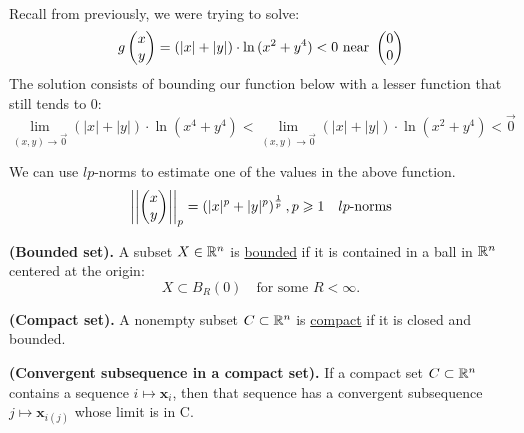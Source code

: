 \\

Recall from previously, we were trying to solve:
\[g\begin{pmatrix} x \\ y \end{pmatrix}= \left( |x|+|y| \right)\cdot \ln{(x^2+y^4)}<0 \text{ near }\begin{pmatrix} 0 \\ 0 \end{pmatrix}\]
The solution consists of bounding our function below with a lesser function that still tends to 0: 
\[\lim_{(x,y)\to \vec{0}}(|x|+|y|)\cdot \ln{(x^4+y^4)}<\lim_{(x,y)\to \vec{0}}(|x|+|y|)\cdot \ln{(x^2+y^4)}<\vec{0}\]

We can use $lp$-norms to estimate one of the values in the above function.
\[\left|\left| \begin{pmatrix} x \\ y \end{pmatrix}\right|\right|_p=\left(|x|^p + |y|^p\right)^{\frac{1}{p}}, p\geqslant 1\quad lp\text{-norms}\]

\iffalse
\[(x^4+y^4)^{\frac{1}{4}}\cdot \ln{(x^4+y^4)}<(|x|+|y|)\cdot \ln{(x^4+y^4)}<g\Point{x \\ y}<0\]
We can then rewrite the new function as
\[f\Point{x \\ y}=f(x^2+y^2)=f(u)=u^{\frac{1}{4}}\cdot \ln{(u)}\]
\[\lim_{u\rightarrow 0} f(u)=\lim_{u\rightarrow 0} u^{\frac{1}{4}}\cdot \ln{(u)}=\lim_{u\rightarrow 0} \frac{\ln{(u)}}{u^{-\frac{1}{4}}}=\lim_{u\rightarrow 0} \frac{(\ln{(u)})'}{(u^{-\frac{1}{4}})'}=\lim_{u\rightarrow 0} \frac{u^{-1}}{\frac{1}{4}u^{5/4}}\] \fi


\begin{defn}
  \textbf{(Bounded set).} A subset $X\in \mathbb{R}^n$ is \ul{bounded} if it is contained in a ball in $\mathbb{R}^n$ centered at the origin:
  \[X\subset B_R(0)\quad \text{for some }R<\infty.\]
\end{defn}

\begin{defn}
  \textbf{(Compact set).} A nonempty subset $C\subset \mathbb{R}^n$ is \ul{compact} if it is closed and bounded.
\end{defn}

\begin{theorem}
  \textbf{(Convergent subsequence in a compact set).} If a compact set $C\subset \mathbb{R}^n$ contains a sequence $i\mapsto \bm{x}_i$, then that sequence has a convergent subsequence $j\mapsto \bm{x}_{i(j)}$ whose limit is in C.
\end{theorem}
